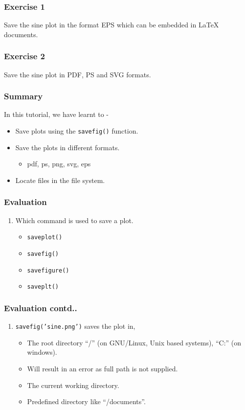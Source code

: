 \documentclass[17pt,compress]{beamer}
\newcounter{saveenumi}
\newcommand{\seti}{\setcounter{saveenumi}{\value{enumi}}}
\newcommand{\conti}{\setcounter{enumi}{\value{saveenumi}}}
\begin{document}
\begin{frame}
\frametitle{Exercise 1}
\label{sec-7}
Save the sine plot in the format EPS which can be embedded in \LaTeX{} documents.
\end{frame}
\begin{frame}
\frametitle{Exercise 2}
\label{sec-8}
Save the sine plot in PDF, PS and SVG formats.
\end{frame}
\begin{frame}
\frametitle{Summary}
\label{sec-9}
In this tutorial, we have learnt to -
\begin{itemize}
\item Save plots using the \texttt{savefig()} function.
\item Save the plots in different formats.
\begin{itemize}
\item pdf, ps, png, svg, eps
\end{itemize}
\item Locate files in the file system.
\end{itemize}
\end{frame}
\begin{frame}
\frametitle{Evaluation}
\label{sec-10}
\begin{enumerate}
\item Which command is used to save a plot.\pause
	\begin{itemize}
	\item \texttt{saveplot()}
	\item \texttt{savefig()}
	\item \texttt{savefigure()}
	\item \texttt{saveplt()}
	\end{itemize}
	\seti
\end{enumerate}
\end{frame}
\begin{frame}
\frametitle{Evaluation contd..}
\begin{enumerate}
\conti
\item \texttt{savefig('sine.png')} saves the plot in,\pause
\begin{itemize}
\item The root directory ``/'' (on GNU/Linux, Unix based systems),
``C:'' (on windows).\pause
\item Will result in an error as full path is not supplied.\pause
\item The current working directory.\pause
\item Predefined directory like ``/documents''.
\end{itemize}
\end{enumerate}
\end{frame}
\end{document}
